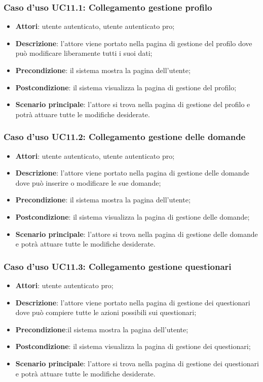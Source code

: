 \subsubsection{Caso d'uso UC11.1: Collegamento gestione profilo}
\begin{itemize}
\item\textbf{Attori}: utente autenticato, utente autenticato pro;
\item\textbf{Descrizione}: l'attore viene portato nella pagina di gestione del profilo dove può modificare liberamente tutti i suoi dati;
\item\textbf{Precondizione}: il sistema mostra la pagina dell'utente;
\item\textbf{Postcondizione}: il sistema visualizza la pagina di gestione del profilo;
\item\textbf{Scenario principale}: l'attore si trova nella pagina di gestione del profilo e potrà attuare tutte le modifiche desiderate.
\end{itemize}

\subsubsection{Caso d'uso UC11.2: Collegamento gestione delle domande}
\begin{itemize}
\item\textbf{Attori}: utente autenticato, utente autenticato pro;
\item\textbf{Descrizione}: l'attore viene portato nella pagina di gestione delle domande dove può inserire o modificare le sue domande;
\item\textbf{Precondizione}: il sistema mostra la pagina dell'utente;

\item\textbf{Postcondizione}: il sistema visualizza la pagina di gestione delle domande;
\item\textbf{Scenario principale}: l'attore si trova nella pagina di gestione delle domande e potrà attuare tutte le modifiche desiderate.
\end{itemize}

\subsubsection{Caso d'uso UC11.3: Collegamento gestione questionari}
\begin{itemize}
\item\textbf{Attori}: utente autenticato pro;
\item\textbf{Descrizione}: l'attore viene portato nella pagina di gestione dei questionari dove può compiere tutte le azioni possibili sui questionari;
\item\textbf{Precondizione}:il sistema mostra la pagina dell'utente;
\item\textbf{Postcondizione}: il sistema visualizza la pagina di gestione dei questionari;
\item\textbf{Scenario principale}: l'attore si trova nella pagina di gestione dei questionari e potrà attuare tutte le modifiche desiderate.
\end{itemize}

